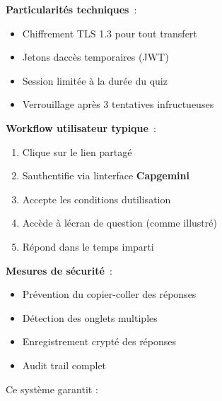 \documentclass[12pt,a4paper,twoside,openright]{report}
\begin{document}
\textbf{Particularités techniques}~:

\begin{itemize}
\item
  Chiffrement TLS 1.3 pour tout transfert
\item
  Jetons d\textquotesingle accès temporaires (JWT)
\item
  Session limitée à la durée du quiz
\item
  Verrouillage après 3 tentatives infructueuses
\end{itemize}

\textbf{Workflow utilisateur typique}~:

\begin{enumerate}
\def\labelenumi{\arabic{enumi}.}
\item
  Clique sur le lien partagé
\item
  S\textquotesingle authentifie via l\textquotesingle interface
  \textbf{Capgemini}
\item
  Accepte les conditions d\textquotesingle utilisation
\item
  Accède à l\textquotesingle écran de question (comme illustré)
\item
  Répond dans le temps imparti
\end{enumerate}

\textbf{Mesures de sécurité}~:

\begin{itemize}
\item
  Prévention du copier-coller des réponses
\item
  Détection des onglets multiples
\item
  Enregistrement crypté des réponses
\item
  Audit trail complet
\end{itemize}

Ce système garantit :
\end{document}
